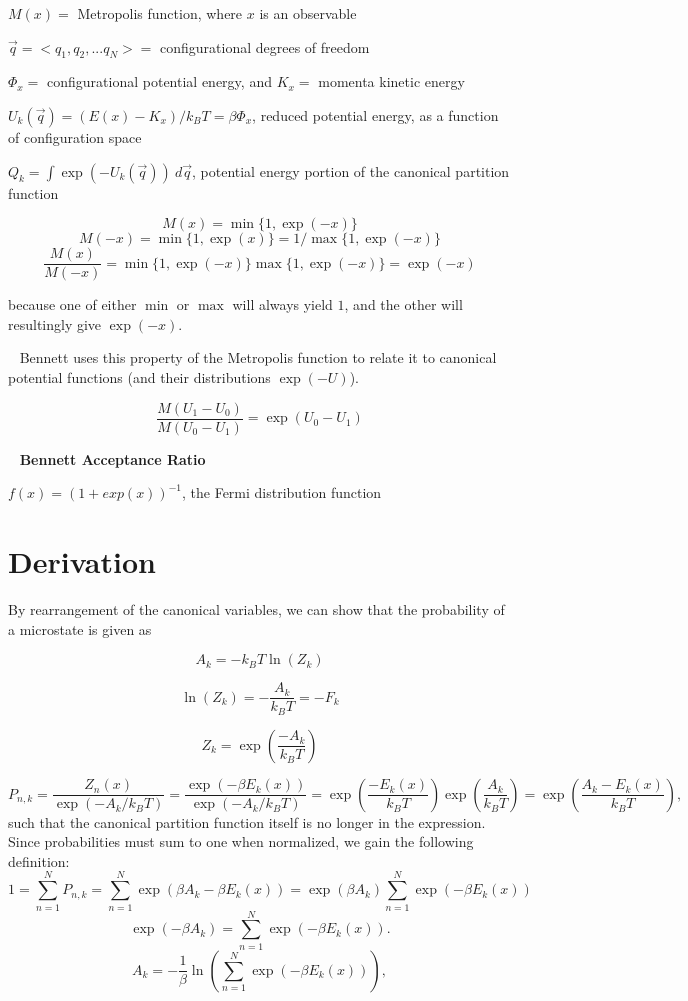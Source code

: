 \documentclass[]{article}
\begin{document}
$M(x) =$ Metropolis function, where $x$ is an observable

$\vec{q} = {<}q_1, q_2, ... q_N{>} =$ configurational degrees of freedom

$\Phi_x =$ configurational potential energy, and $K_x =$ momenta kinetic energy

$U_k(\vec{q}) = (E(x) - K_x)/k_B T = \beta \Phi_x$, reduced potential energy, as a function of configuration space

$Q_k = \int \exp(-U_k(\vec{q}))~d\vec{q}$, potential energy portion of the canonical partition function

\[ M(x) = \min \{ 1, \exp(-x) \} \]
\[ M(-x) = \min \{ 1, \exp(x) \} = 1/ \max \{ 1, \exp(-x) \} \]
\[ \frac{M(x)}{M(-x)} = \min \{ 1, \exp(-x) \} \max \{ 1, \exp(-x) \}  = \exp(-x) \]

because one of either $\min$ or $\max$ will always yield $1$, and the other will resultingly give $\exp(-x)$.

~\linebreak
Bennett uses this property of the Metropolis function to relate it to canonical potential functions (and their distributions $\exp(-U)$).

\[ \frac{M(U_1 - U_0)}{M(U_0 - U_1)} = \exp(U_0 - U_1) \]

~\linebreak
\textbf{Bennett Acceptance Ratio}\cite{bennett}

$f(x) = (1 + exp(x))^{-1}$, the Fermi distribution function

\section*{Derivation}

By rearrangement of the canonical variables, we can show that the probability of a microstate\cite{wikiCPF} is given as
\begin{minipage}[b]{0.32\linewidth}
	\[ A_k = -k_B T \ln(Z_k) \]
\end{minipage}
\hfill
\begin{minipage}[b]{0.32\linewidth}
	\[ \ln(Z_k) = -\frac{A_k}{k_B T} = -F_k \]
\end{minipage}
\hfill
\begin{minipage}[b]{0.32\linewidth}
	\[ Z_k = \exp \left( \frac{-A_k}{k_B T} \right) \]
\end{minipage}
\[ P_{n,k} = \frac{Z_n(x)}{\exp (-A_k/k_B T)} = \frac{\exp(-\beta E_k(x))}{\exp (-A_k/k_B T)} = \exp\left(\frac{-E_k(x)}{k_B T}\right) \exp \left( \frac{A_k}{k_B T} \right) = \exp\left(\frac{A_k-E_k(x)}{k_B T} \right), \]
such that the canonical partition function itself is no longer in the expression. Since probabilities must sum to one when normalized, we gain the following definition:
\[ 1 = \sum_{n=1}^{N} P_{n,k} = \sum_{n=1}^{N} \exp(\beta A_k - \beta E_k(x)) = \exp(\beta A_k) \sum_{n=1}^{N} \exp(- \beta E_k(x)) \]
\[ \exp(-\beta A_k) = \sum_{n=1}^{N} \exp(- \beta E_k(x)). \]
\[ A_k = -\frac{1}{\beta} \ln \left( \sum_{n=1}^{N} \exp(- \beta E_k(x)) \right), \]
\end{document}
